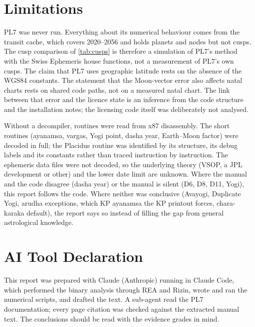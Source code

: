 \documentclass[11pt, a4paper]{article}
\DeclareRobustCommand{\_}{\textunderscore\allowbreak}
\begin{document}





\section{Limitations}
\label{sec:limits}

PL7 was never run. Everything about its numerical behaviour comes from the transit cache,
which covers 2020--2056 and holds planets and nodes but not cusps. The cusp comparison of
\autoref{tab:cusps} is therefore a simulation of PL7's method with the Swiss Ephemeris house
functions, not a measurement of PL7's own cusps. The claim that PL7 uses geographic
latitude rests on the absence of the WGS84 constants. The statement that the Moon-vector
error also affects natal charts rests on shared code paths, not on a measured natal chart.
The link between that error and the licence state is an inference from the code structure
and the installation notes; the licensing code itself was deliberately not analysed.

Without a decompiler, routines were read from x87 disassembly. The short routines
(ayanamsa, vargas, Yogi point, dasha year, Earth--Moon factor) were decoded in full; the
Placidus routine was identified by its structure, its debug labels and its constants rather
than traced instruction by instruction. The ephemeris data files were not decoded, so the
underlying theory (VSOP, a JPL development or other) and the lower date limit are unknown.
Where the manual and the code disagree (dasha year) or the manual is silent (D6, D8, D11,
Yogi), this report follows the code. Where neither was conclusive (Avayogi, Duplicate Yogi,
arudha exceptions, which KP ayanamsa the KP printout forces, chara-karaka default), the
report says so instead of filling the gap from general astrological knowledge.

\section*{AI Tool Declaration}

This report was prepared with Claude (Anthropic) running in Claude Code, which performed
the binary analysis through REA and Rizin, wrote and ran the numerical scripts, and drafted
the text. A sub-agent read the PL7 documentation; every page citation was checked against
the extracted manual text. The conclusions should be read with the evidence grades in mind.
\end{document}
